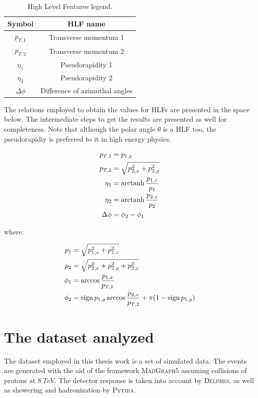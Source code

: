 \begin{table}[H]
	\begin{center}
		\begin{tabular}{c c}
			\toprule
			Symbol	&	HLF name	\\
			\midrule
			$p_{T,1}$		&	Transverse momentum 1			\\
			$p_{T,2}$		&	Transverse momentum 2			\\
			$\eta_{1}$		&	Pseudorapidity 1				\\
			$\eta_{2}$		&	Pseudorapidity 2				\\
			$\Delta \phi$	&	Difference of azimuthal angles	\\
			\bottomrule
		\end{tabular}
		\caption{High Level Features legend.}
		\label{tab:HLF}
	\end{center}
\end{table}

The relations employed to obtain the values for HLFs are presented in the space below. The intermediate steps to get the results are presented as well for completeness. Note that although the polar angle $\theta$ is a HLF too, the pseudorapidiy is preferred to it in high energy physics.

\begin{align}
	p_{T,1} &= p_{1,x}	\\
	p_{T,2} &= \sqrt{ p_{2,x}^2 + p_{2,y}^2 }	\\
	\eta_{1} &= \operatorname{arctanh}{ \frac{p_{1,z}}{p_{1}} }	\\
	\eta_{2} &= \operatorname{arctanh}{ \frac{p_{2,z}}{p_{2}} }	\\
	\Delta \phi &= \phi_{2} - \phi_{1}
\end{align}

\noindent
where:

\begin{align}
	p_{1} &= \sqrt{ p_{1,x}^2 + p_{1,z}^2 }	\\
	p_{2} &= \sqrt{ p_{2,x}^2 + p_{2,y}^2 + p_{2,z}^2 }	\\
	\phi_{1} &= \arccos{ \frac{p_{1,x}}{p_{T,1}} }	\\
	\phi_{2} &= \operatorname{sign}{p_{1,y}} \arccos{ \frac{p_{2,x}}{p_{T,2}} } + \pi (1 - \operatorname{sign}{p_{1,y}})
\end{align}





\section{The dataset analyzed}
The dataset employed in this thesis work is a set of simulated data. The events are generated with the aid of the framework \textsc{MadGraph5} assuming collisions of protons at $8~\si{TeV}$. The detector response is taken into account by \textsc{Delphes}, as well as showering and hadronization by \textsc{Pythia}.

